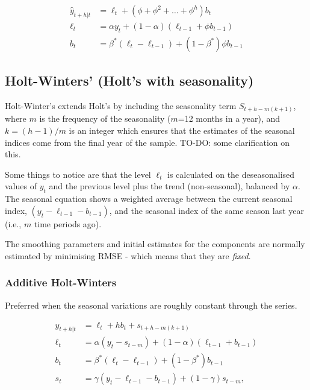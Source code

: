 \documentclass{article}
\begin{document}
\begin{align*}
  \hat{y}_{t+h|t} & = \ell_{t} + (\phi+\phi^2 + \dots + \phi^{h})b_{t} \\
  \ell_{t} &= \alpha y_{t} + (1 - \alpha)(\ell_{t-1} + \phi b_{t-1}) \\
  b_{t} & = \beta^*(\ell_{t} - \ell_{t-1}) + (1 -\beta^*)\phi b_{t-1}
\end{align*}

\subsection{Holt-Winters' (Holt's with seasonality)}

Holt-Winter's extends Holt's by including the seasonality term $S_{t+h-m(k+1)}$, where $m$ is the frequency of the seasonality ($m$=12 months in a year), and $k=(h-1)/m$ is an integer which ensures that the estimates of the seasonal indices come from the final year of the sample. TO-DO: some clarification on this.

Some things to notice are that the level $\ell_{t}$ is calculated on the deseasonalised values of $y_t$ and the previous level plus the trend (non-seasonal), balanced by $\alpha$. The seasonal equation shows a weighted average between the current seasonal index, $(y_{t}-\ell_{t-1}-b_{t-1})$, and the seasonal index of the same season last year (i.e., $m$ time periods ago).

The smoothing parameters and initial estimates for the components are normally estimated by minimising RMSE - which means that they are \textit{fixed}.

\subsubsection{Additive Holt-Winters}
Preferred when the seasonal variations are roughly constant through the series.


\begin{align*}
  \hat{y}_{t+h|t} & = \ell_{t} + hb_{t} + s_{t+h-m(k+1)} \\
  \ell_{t} & = \alpha(y_{t} - s_{t-m}) + (1 - \alpha)(\ell_{t-1} + b_{t-1})\\
  b_{t} & = \beta^*(\ell_{t} - \ell_{t-1}) + (1 - \beta^*)b_{t-1}\\
  s_{t} & = \gamma (y_{t}-\ell_{t-1}-b_{t-1}) + (1-\gamma)s_{t-m},
\end{align*}
\end{document}
